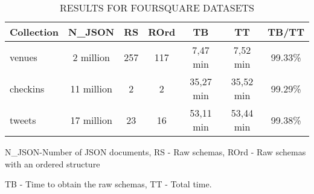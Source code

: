 \documentclass[sigconf, nonacm]{acmart}
\begin{document}
\begin{table}[h]
\centering
\caption{RESULTS FOR FOURSQUARE DATASETS \cite{frozza2018approach}} 
\scalebox{0.85} {
\begin{tabular}{|l|c|c|c|c|c|c|}
\hline
\textbf{Collection} & \textbf{N\_JSON} & \textbf{RS} & \textbf{ROrd} & \textbf{TB}      & \textbf{TT}   & \textbf{TB/TT}        \\ \hline
venues              & 2 million        & 257         & 117            & 7,47 min         & 7,52 min  &99.33\%        \\ \hline 
checkins            & 11 million       & 2           & 2              & 35,27 min        & 35,52 min  &99.29\%      \\ \hline
tweets              & 17 million       & 23          & 16             & 53,11 min        & 53,44 min   &99.38\%     \\ \hline
\end{tabular}
}
\newline
\newline
\newline
N\_JSON-Number of JSON documents, RS - Raw schemas, ROrd - Raw schemas with an ordered structure

TB - Time to obtain the raw schemas, TT - Total time.
\label{table:result}
\end{table}



\end{document}
